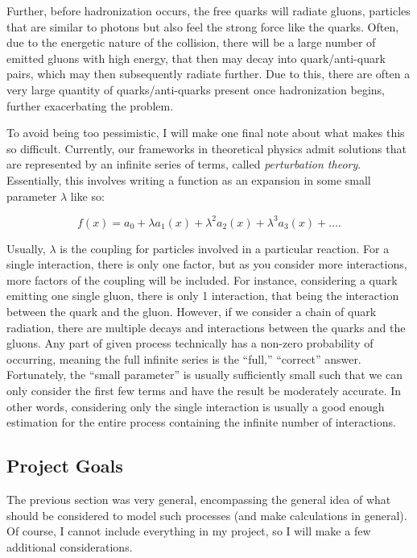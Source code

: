 Further, before hadronization occurs, the free quarks will radiate gluons, particles that are similar to photons but also feel the strong force like the quarks. Often, due to the energetic nature of the collision, there will be a large number of emitted gluons with high energy, that then may decay into quark/anti-quark pairs, which may then subsequently radiate further. Due to this, there are often a very large quantity of quarks/anti-quarks present once hadronization begins, further exacerbating the problem.

To avoid being too pessimistic, I will make one final note about what makes this so difficult. Currently, our frameworks in theoretical physics admit solutions that are represented by an infinite series of terms, called \textit{perturbation theory}. Essentially, this involves writing a function as an expansion in some small parameter $\lambda$ like so:

\begin{equation}
  f(x) = a_0 + \lambda a_1(x) + \lambda^2 a_2(x) + \lambda^3 a_3(x) + \ldots.\label{eq:1-intro-perturbation}
\end{equation}

Usually, $\lambda$ is the coupling for particles involved in a particular reaction. For a single interaction, there is only one factor, but as you consider more interactions, more factors of the coupling will be included. For instance, considering a quark emitting one single gluon, there is only 1 interaction, that being the interaction between the quark and the gluon. However, if we consider a chain of quark radiation, there are multiple decays and interactions between the quarks and the gluons. Any part of given process technically has a non-zero probability of occurring, meaning the full infinite series is the ``full,'' ``correct'' answer. Fortunately, the ``small parameter'' is usually sufficiently small such that we can only consider the first few terms and have the result be moderately accurate. In other words, considering only the single interaction is usually a good enough estimation for the entire process containing the infinite number of interactions.

\subsection{Project Goals}

The previous section was very general, encompassing the general idea of what should be considered to model such processes (and make calculations in general). Of course, I cannot include everything in my project, so I will make a few additional considerations.

